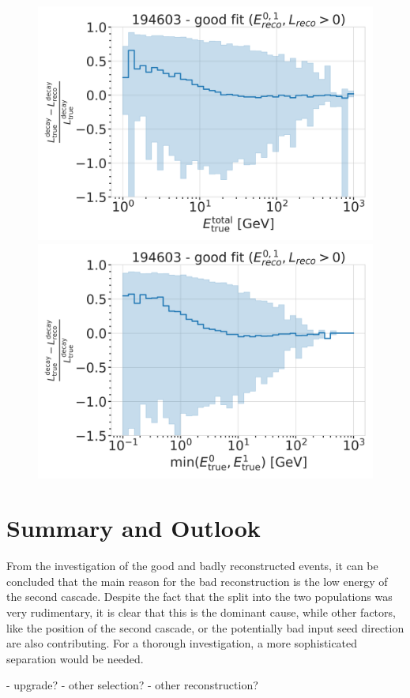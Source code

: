 \begin{figure}[h]
	\centering
    \includegraphics[width=0.49\linewidth]{figures/model_independent_simulation/results/realistic/resolutions/194603_median_decay_length_bias_vs_tot_energy_goodfit_log_unweighted.png}
    \includegraphics[width=0.49\linewidth]{figures/model_independent_simulation/results/realistic/resolutions/194603_median_decay_length_bias_vs_min_energy_goodfit_log_unweighted.png} 
    \caption[]{}
\end{figure}


\section{Summary and Outlook}


From the investigation of the good and badly reconstructed events, it can be concluded that the main reason for the bad reconstruction is the low energy of the second cascade. Despite the fact that the split into the two populations was very rudimentary, it is clear that this is the dominant cause, while other factors, like the position of the second cascade, or the potentially bad input seed direction are also contributing. For a thorough investigation, a more sophisticated separation would be needed.


- upgrade?
- other selection?
- other reconstruction?
